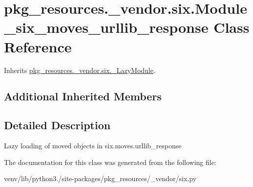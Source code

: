 \hypertarget{classpkg__resources_1_1__vendor_1_1six_1_1_module__six__moves__urllib__response}{}\section{pkg\+\_\+resources.\+\_\+vendor.\+six.\+Module\+\_\+six\+\_\+moves\+\_\+urllib\+\_\+response Class Reference}
\label{classpkg__resources_1_1__vendor_1_1six_1_1_module__six__moves__urllib__response}


Inherits \hyperlink{classpkg__resources_1_1__vendor_1_1six_1_1___lazy_module}{pkg\+\_\+resources.\+\_\+vendor.\+six.\+\_\+\+Lazy\+Module}.

\subsection*{Additional Inherited Members}


\subsection{Detailed Description}
\begin{DoxyVerb}Lazy loading of moved objects in six.moves.urllib_response\end{DoxyVerb}
 

The documentation for this class was generated from the following file\+:\begin{DoxyCompactItemize}
\item 
venv/lib/python3./site-\/packages/pkg\+\_\+resources/\+\_\+vendor/six.\+py\end{DoxyCompactItemize}
